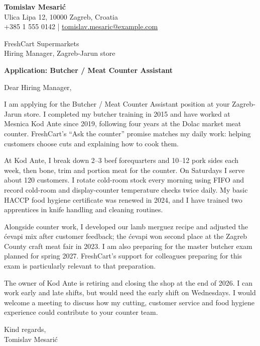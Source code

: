 \documentclass[11pt,a4paper]{article}
\begin{document}
{\large\bfseries\color{primarycolor} Tomislav Mesarić}\\
Ulica Lipa 12, 10000 Zagreb, Croatia\\
+385 1 555 0142 | \href{mailto:tomislav.mesaric@example.com}{tomislav.mesaric@example.com}

FreshCart Supermarkets\\
Hiring Manager, Zagreb-Jarun store

\textbf{Application: Butcher / Meat Counter Assistant}

Dear Hiring Manager,

I am applying for the Butcher / Meat Counter Assistant position at your Zagreb-Jarun store. I completed my butcher training in 2015 and have worked at Mesnica Kod Ante since 2019, following four years at the Dolac market meat counter. FreshCart's “Ask the counter” promise matches my daily work: helping customers choose cuts and explaining how to cook them.

At Kod Ante, I break down 2–3 beef forequarters and 10–12 pork sides each week, then bone, trim and portion meat for the counter. On Saturdays I serve about 120 customers. I rotate cold-room stock every morning using FIFO and record cold-room and display-counter temperature checks twice daily. My basic HACCP food hygiene certificate was renewed in 2024, and I have trained two apprentices in knife handling and cleaning routines.

Alongside counter work, I developed our lamb merguez recipe and adjusted the ćevapi mix after customer feedback; the ćevapi won second place at the Zagreb County craft meat fair in 2023. I am also preparing for the master butcher exam planned for spring 2027. FreshCart's support for colleagues preparing for this exam is particularly relevant to that preparation.

The owner of Kod Ante is retiring and closing the shop at the end of 2026. I can work early and late shifts, but would need the early shift on Wednesdays. I would welcome a meeting to discuss how my cutting, customer service and food hygiene experience could contribute to your counter team.

Kind regards,\\
Tomislav Mesarić
\end{document}
